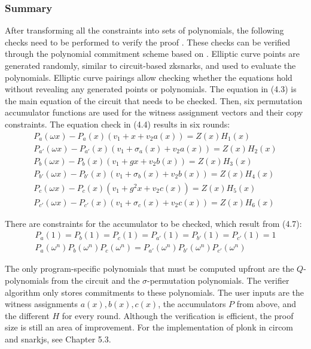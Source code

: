 \subsubsection{Summary}
After transforming all the constraints into sets of polynomials, the following checks need to be performed to verify the proof \citep{PLONKcryptoeprint:2019/953, buterinplonk, chen2022review}. These checks can be verified through the polynomial commitment scheme based on \citep{Kate2010ConstantSizeCT}. Elliptic curve points are generated randomly, similar to circuit-based \acrshort{zksnark}s, and used to evaluate the polynomials. Elliptic curve pairings allow checking whether the equations hold without revealing any generated points or polynomials. 
The equation in (4.3) is the main equation of the circuit that needs to be checked. Then, six permutation accumulator functions are used for the witness assignment vectors and their copy constraints. The equation check in (4.4) results in six rounds:
\begin{align}
    P_{a}(\omega x) - P_{a}(x)(v_1 + x + v_2a(x)) = Z(x)H_{1}(x) \\
    P_{a'}(\omega x) - P_{a'}(x)(v_1 + \sigma_{a}(x) + v_2a(x)) = Z(x)H_{2}(x) \\
    P_{b}(\omega x) - P_{b}(x)(v_1 + gx + v_2b(x)) = Z(x)H_{3}(x) \\
    P_{b'}(\omega x) - P_{b'}(x)(v_1 + \sigma_{b}(x) + v_2b(x)) = Z(x)H_{4}(x) \\
    P_{c}(\omega x) - P_{c}(x)(v_1 + g^{2}x + v_2c(x)) = Z(x)H_{5}(x) \\
    P_{c'}(\omega x) - P_{c'}(x)(v_1 + \sigma_{c}(x) + v_2c(x)) = Z(x)H_{6}(x)
\end{align}

There are constraints for the accumulator to be checked, which result from (4.7):
\begin{align}
    P_{a}(1) = P_{b}(1) = P_{c}(1) = P_{a'}(1) = P_{b'}(1) = P_{c'}(1) = 1 \\
    P_{a}(\omega^n)P_{b}(\omega^n)P_{c}(\omega^n) = P_{a'}(\omega^n)P_{b'}(\omega^n)P_{c'}(\omega^n)
\end{align}

The only program-specific polynomials that must be computed upfront are the \(Q\)-polynomials from the circuit and the \(\sigma\)-permutation polynomials. The verifier algorithm only stores commitments to these polynomials. The user inputs are the witness assignments \(a(x), b(x), c(x)\), the accumulators \(P\) from above, and the different \(H\) for every round. Although the verification is efficient, the proof size is still an area of improvement. For the implementation of \acrshort{plonk} in circom and snarkjs, see Chapter 5.3.


